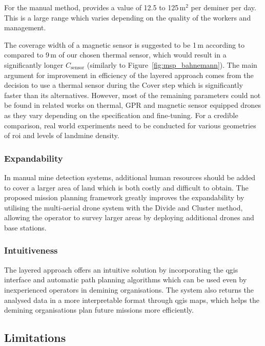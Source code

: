 For the manual method, \cite{gichd2005manual} provides a value of 12.5 to 125\,m$^2$ per deminer per day. This is a large range which varies depending on the quality of the workers and management.

The coverage width of a magnetic sensor is suggested to be 1\,m according to \cite{Yoo2024UnmannedAV} compared to 9\,m of our chosen thermal sensor, which would result in a significantly longer $C_{\mathrm{sensor}}$ (similarly to Figure~\ref{fig:msp_bahnemann}). The main argument for improvement in efficiency of the layered approach comes from the decision to use a thermal sensor during the Cover step which is significantly faster than its alternatives. However, most of the remaining parameters could not be found in related works on thermal, \gls{GPR} and magnetic sensor equipped drones as they vary depending on the specification and fine-tuning. For a credible comparison, real world experiments need to be conducted for various geometries of \gls{roi} and levels of landmine density.  

\subsubsection{Expandability}

In manual mine detection systems, additional human resources should be added to cover a larger area of land which is both costly and difficult to obtain. The proposed mission planning framework greatly improves the expandability by utilising the multi-aerial drone system with the Divide and Cluster method, allowing the operator to survey larger areas by deploying additional drones and base stations. 

\subsubsection{Intuitiveness}

The layered approach offers an intuitive solution by incorporating the \gls{qgis} interface and automatic path planning algorithms which can be used even by inexperienced operators in demining organisations. The system also returns the analysed data in a more interpretable format through \gls{qgis} maps, which helps the demining organisations plan future missions more efficiently.

\subsection{Limitations}
\label{sec:msp_limitations}

